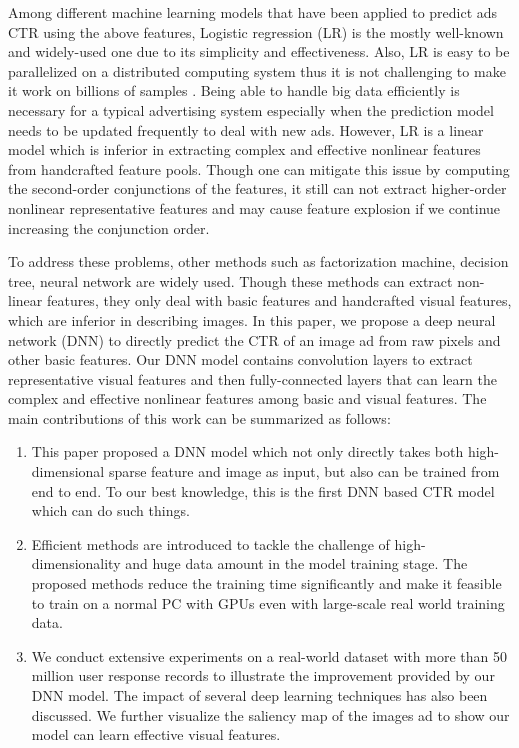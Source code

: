 \documentclass{sig-alternate}
\begin{document}
Among different machine learning models that have been applied to predict ads CTR using the above features, Logistic regression (LR) is the mostly well-known and widely-used one due to its simplicity and effectiveness. Also, LR is easy to be parallelized on a distributed computing system thus it is not challenging to make it work on billions of samples \cite{chapelle2014simple}. Being able to handle big data efficiently is necessary for a typical advertising system especially when the prediction model needs to be updated frequently to deal with new ads. However, LR is a linear model which is inferior in extracting complex and effective nonlinear features from handcrafted feature pools. Though one can mitigate this issue by computing the second-order conjunctions of the features, it still can not extract higher-order nonlinear representative features and may cause feature explosion if we continue increasing the conjunction order. %

To address these problems, other methods such as factorization machine, decision tree, neural network are widely used. Though these methods can extract non-linear features, they only deal with basic features and handcrafted visual features, which are inferior in describing images. In this paper, we propose a deep neural network (DNN) to directly predict the CTR of an image ad from raw pixels and other basic features. Our DNN model contains convolution layers to extract representative visual features and then fully-connected layers that can learn the complex and effective nonlinear features among basic and visual features. The main contributions of this work can be summarized as follows:
\begin{enumerate}
	\item This paper proposed a DNN model which not only directly takes both high-dimensional sparse feature and image as input, but also can be trained from end to end. To our best knowledge, this is the first DNN based CTR model which can do such things.
	\item Efficient methods are introduced to tackle the challenge of  high-dimensionality and huge data amount in the model training stage. The proposed methods reduce the training time significantly and make it feasible to train on a normal PC with GPUs even with large-scale real world training data.
	\item We conduct extensive experiments on a real-world dataset with more than 50 million user response records to illustrate the improvement provided by our DNN model.  The impact of several deep learning techniques has also been discussed.  We further visualize the saliency map of the images ad to show our model can learn effective visual features.
\end{enumerate}
\end{document}

